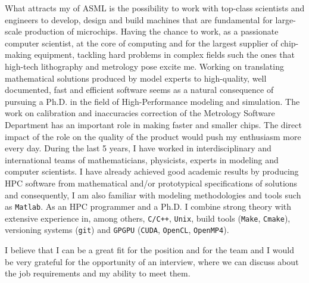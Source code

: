 \documentclass[12pt,a4paper,sans]{moderncv}        %
\begin{document}
What attracts my of ASML is the possibility to work with top-class scientists and engineers to develop, design and build machines that are fundamental for large-scale production of microchips. Having the chance to work, as a passionate computer scientist, at the core of computing and for the largest supplier of chip-making equipment, tackling hard problems in complex fields such the ones that high-tech lithography and metrology pose excite me. 
Working on translating mathematical solutions produced by model experts to high-quality, well documented, fast and efficient software seems as a natural consequence of pursuing a Ph.D. in the field of High-Performance modeling and simulation.
The work on calibration and inaccuracies correction of the Metrology Software Department has an important role in making faster and smaller chips. The direct impact of the role on the quality of the product would push my enthusiasm more every day.
During the last 5 years, I have worked in interdisciplinary and international teams of mathematicians, physicists, experts in modeling and computer scientists. I have already achieved good academic results by producing HPC software from mathematical and/or prototypical specifications of solutions and consequently, I am also familiar with modeling methodologies and tools such as \texttt{Matlab}.
As an HPC programmer and a Ph.D. I combine strong theory with extensive experience in, among others, \texttt{C/C++}, \texttt{Unix}, build tools (\texttt{Make}, \texttt{\texttt{Cmake}}), versioning systems (\texttt{git}) and \texttt{GPGPU} (\texttt{CUDA}, \texttt{OpenCL}, \texttt{OpenMP4}). 

I believe that I can be a great fit for the position and for the team and I would be very grateful for the opportunity of an interview, where we can discuss about the job requirements and my ability to meet them.



\makeletterclosing
\end{document}
